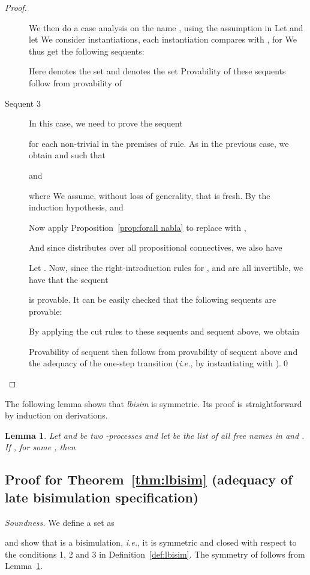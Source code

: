 \documentclass{acmtrans2m}
\newtheorem{lemma}[theorem]{Lemma}
\newcommand{\ie}{{\em i.e.}}
\begin{document}
\begin{proof}
\begin{description}
We then do a case analysis on the name , using the assumption
 in  
Let  and let 
We consider  instantiations, each instantiation compares 
with , for  We thus get the following sequents:

Here  denotes the set  and
 denotes the set 
Provability of these sequents follow from provability of 

\item[Sequent 3] In this case, we need to prove the sequent

for each non-trivial  in the premises of  rule. As in the previous case, we obtain
 and  such that

and

where  We assume, without loss of generality, that  is fresh.
By the induction hypothesis,  and 

Now apply Proposition~\ref{prop:forall nabla} to replace  with ,

And since  distributes over all propositional connectives, we also have

Let .
Now, since the right-introduction rules for ,  and  are all invertible,
we have that the sequent

is provable. It can be easily checked that the following sequents are provable:

By applying the cut rules to these sequents and sequent  above, we
obtain

Provability of sequent  then follows from provability of sequent  above
and the adequacy of the one-step transition (\ie, by instantiating 
with ).\qed
\end{description}
\end{proof}

The following lemma shows that {\em lbisim} is symmetric. Its proof is
straightforward by induction on derivations. 

\begin{lemma}
\label{lm:lbisim-sym}
Let  and  be two -processes and let  be the
list of all free names in  and .
If , for
some , then 

\end{lemma}


\subsection{Proof for Theorem~\ref{thm:lbisim} (adequacy of late bisimulation specification)}

{\em Soundness.} 
We define a set  as

and show that  is a bisimulation, \ie, it is symmetric and 
closed with respect to the conditions 1, 2 and 3 in Definition~\ref{def:lbisim}.
The symmetry of  follows from Lemma~\ref{lm:lbisim-sym}.
\end{document}
